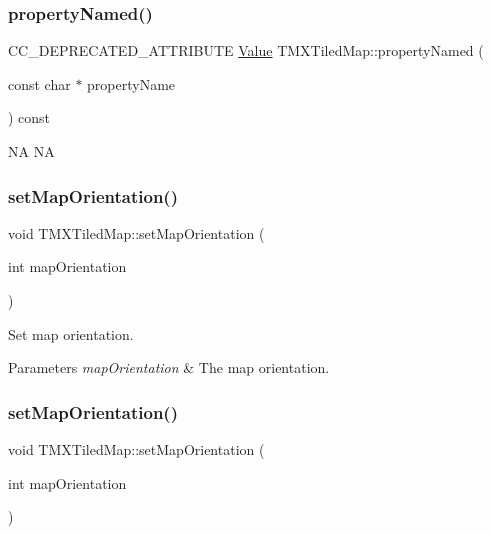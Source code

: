 \subsubsection{\texorpdfstring{property\+Named()}{propertyNamed()}\hspace{0.1cm}{\footnotesize\ttfamily [2/2]}}
{\footnotesize\ttfamily C\+C\+\_\+\+D\+E\+P\+R\+E\+C\+A\+T\+E\+D\+\_\+\+A\+T\+T\+R\+I\+B\+U\+TE \hyperlink{classValue}{Value} T\+M\+X\+Tiled\+Map\+::property\+Named (\begin{DoxyParamCaption}\item[{const char $\ast$}]{property\+Name }\end{DoxyParamCaption}) const\hspace{0.3cm}{\ttfamily [inline]}}

NA  NA \mbox{\label{classTMXTiledMap_a81939a89dde9fd5e2b3202d13588e274}} 
\subsubsection{\texorpdfstring{set\+Map\+Orientation()}{setMapOrientation()}\hspace{0.1cm}{\footnotesize\ttfamily [1/2]}}
{\footnotesize\ttfamily void T\+M\+X\+Tiled\+Map\+::set\+Map\+Orientation (\begin{DoxyParamCaption}\item[{int}]{map\+Orientation }\end{DoxyParamCaption})\hspace{0.3cm}{\ttfamily [inline]}}

Set map orientation.


\begin{DoxyParams}{Parameters}
{\em map\+Orientation} & The map orientation. \\
\hline
\end{DoxyParams}
\mbox{\label{classTMXTiledMap_a81939a89dde9fd5e2b3202d13588e274}} 
\subsubsection{\texorpdfstring{set\+Map\+Orientation()}{setMapOrientation()}\hspace{0.1cm}{\footnotesize\ttfamily [2/2]}}
{\footnotesize\ttfamily void T\+M\+X\+Tiled\+Map\+::set\+Map\+Orientation (\begin{DoxyParamCaption}\item[{int}]{map\+Orientation }\end{DoxyParamCaption})\hspace{0.3cm}{\ttfamily [inline]}}

